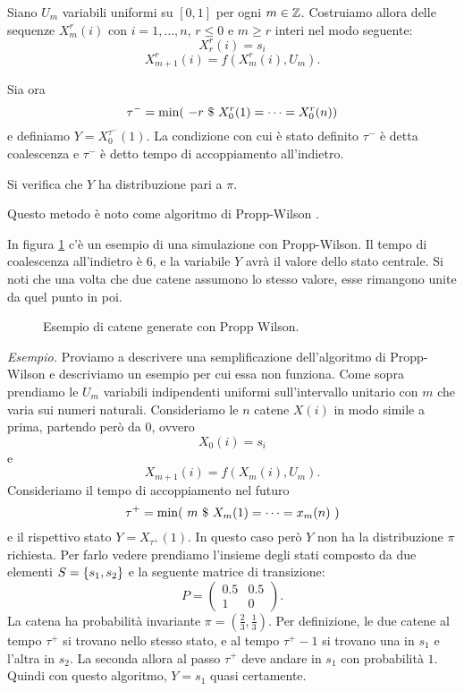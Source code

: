 \documentclass[]{marticle}
\begin{document}
Siano $U_m$ variabili uniformi su $[0,1]$ per ogni $m\in \mathbb{Z}$. Costruiamo allora
delle sequenze $X^r_m(i)$ con $i = 1,\dots,n$, $r\leq 0$ e $m \geq r$ interi nel
modo seguente:
\[
    X^r_r(i) = s_i
\]
\[
    X^r_{m+1}(i) = f(X^r_m(i), U_m).
\]

Sia ora 
\[
    \tau^-=\min(\ -r \ \$\  X^r_0(1) = \dots = X^r_0(n))
\]
e definiamo $Y = X^{\tau^-}_0(1)$. La condizione con cui \`e stato definito
$\tau^-$ \`e detta coalescenza e $\tau^-$ \`e detto tempo di accoppiamento
all'indietro.

Si verifica che $Y$ ha distribuzione pari a $\pi$.

Questo metodo \`e noto come algoritmo di Propp-Wilson \cite{propp-wilson}.

In figura \ref{fig:im1} c'\`e un esempio di una simulazione con Propp-Wilson. Il
tempo di coalescenza all'indietro \`e 6, e la variabile $Y$ avr\`a il valore
dello stato centrale. Si noti che una volta che due catene assumono lo stesso
valore, esse rimangono unite da quel punto in poi.

\begin{figure}[h!]

\caption{Esempio di catene generate con Propp Wilson.}
\label{fig:im1}
\centering
\end{figure}


\textit{Esempio.} Proviamo a descrivere una semplificazione dell'algoritmo di
Propp-Wilson e descriviamo un esempio per cui essa non funziona. Come sopra
prendiamo le $U_m$ variabili indipendenti uniformi sull'intervallo unitario con
$m$ che varia sui numeri naturali. Consideriamo le $n$ catene $X(i)$ in modo
simile a prima, partendo per\`o da 0, ovvero
\[
    X_0(i) = s_i
\]
e
\[
    X_{m+1}(i) = f(X_m(i), U_m).
\]
Consideriamo il tempo di accoppiamento nel futuro
\[
    \tau^+ = \min(\ m \st X_m(1) = \dots = x_m(n)\ )
\]
e il rispettivo stato $Y = X_{\tau^+}(1)$. In questo caso per\`o $Y$ non ha la
distribuzione $\pi$ richiesta. 
Per farlo vedere prendiamo l'insieme degli stati composto da due elementi $S =
\{s_1, s_2\}$ e la seguente matrice di transizione:
\[
    P = 
    \begin{pmatrix}
        0.5 & 0.5 \\
        1  & 0
    \end{pmatrix}.
\]
La catena ha probabilit\`a invariante $\pi = (\frac{2}{3}, \frac{1}{3})$. Per
definizione, le due catene al tempo $\tau^+$ si trovano nello stesso stato, e al
tempo $\tau^+-1$ si trovano una in $s_1$ e l'altra in $s_2$. La seconda allora
al passo $\tau^+$ deve andare in $s_1$ con probabilit\`a $1$. Quindi con questo
algoritmo, $Y=s_1$ quasi certamente.
\end{document}
